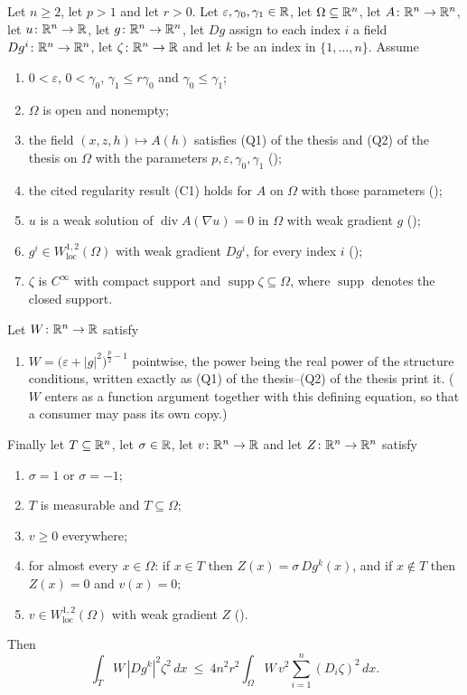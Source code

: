 \begin{helper}
Let $n\ge2$, let $p>1$ and let $r>0$.  Let $\varepsilon,\gamma_0,\gamma_1\in\mathbb{R}$,
let $\Omega\subseteq\mathbb{R}^n$, let $A\colon\mathbb{R}^n\to\mathbb{R}^n$, let $u\colon\mathbb{R}^n\to\mathbb{R}$, let
$g\colon\mathbb{R}^n\to\mathbb{R}^n$, let $Dg$ assign to each index $i$ a field
$Dg^i\colon\mathbb{R}^n\to\mathbb{R}^n$, let $\zeta\colon\mathbb{R}^n\to\mathbb{R}$ and let $k$ be an index in
$\{1,\dots,n\}$.  Assume
\begin{enumerate}
\item[(H1)] $0<\varepsilon$, $0<\gamma_0$, $\gamma_1\le r\gamma_0$ and
  $\gamma_0\le\gamma_1$;
\item[(H2)] $\Omega$ is open and nonempty;
\item[(H3)] the field $(x,z,h)\mapsto A(h)$ satisfies (Q1) of the thesis and
  (Q2) of the thesis on $\Omega$ with the parameters
  $p,\varepsilon,\gamma_0,\gamma_1$ ();
\item[(H4)] the cited regularity result (C1) holds for $A$ on $\Omega$ with
  those parameters ();
\item[(H5)] $u$ is a weak solution of $\operatorname{div}A(\nabla u)=0$ in
  $\Omega$ with weak gradient $g$ ();
\item[(H6)] $g^i\in W^{1,2}_{\mathrm{loc}}(\Omega)$ with weak gradient $Dg^i$,
  for every index $i$ ();
\item[(H7)] $\zeta$ is $C^\infty$ with compact support and
  $\operatorname{supp}\zeta\subseteq\Omega$, where $\operatorname{supp}$ denotes
  the closed support.
\end{enumerate}
Let $W\colon\mathbb{R}^n\to\mathbb{R}$ satisfy
\begin{enumerate}
\item[(H8)] $W=\bigl(\varepsilon+|g|^2\bigr)^{\frac p2-1}$ pointwise, the power
  being the real power of the structure conditions, written exactly as
  (Q1) of the thesis--(Q2) of the thesis print it.  ($W$ enters as a function argument
  together with this defining equation, so that a consumer may pass its own
  copy.)
\end{enumerate}
Finally let $T\subseteq\mathbb{R}^n$, let $\sigma\in\mathbb{R}$, let $v\colon\mathbb{R}^n\to\mathbb{R}$ and let
$Z\colon\mathbb{R}^n\to\mathbb{R}^n$ satisfy
\begin{enumerate}
\item[(H9)] $\sigma=1$ or $\sigma=-1$;
\item[(H10)] $T$ is measurable and $T\subseteq\Omega$;
\item[(H11)] $v\ge0$ everywhere;
\item[(H12)] for almost every $x\in\Omega$: if $x\in T$ then
  $Z(x)=\sigma\,Dg^k(x)$, and if $x\notin T$ then $Z(x)=0$ and $v(x)=0$;
\item[(H13)] $v\in W^{1,2}_{\mathrm{loc}}(\Omega)$ with weak gradient $Z$
  ().
\end{enumerate}
Then
\[
\int_T W\,|Dg^k|^2\zeta^2\,dx
\ \le\ 4n^2r^2\int_\Omega W\,v^2\sum_{i=1}^n(D_i\zeta)^2\,dx .
\]
\end{helper}
